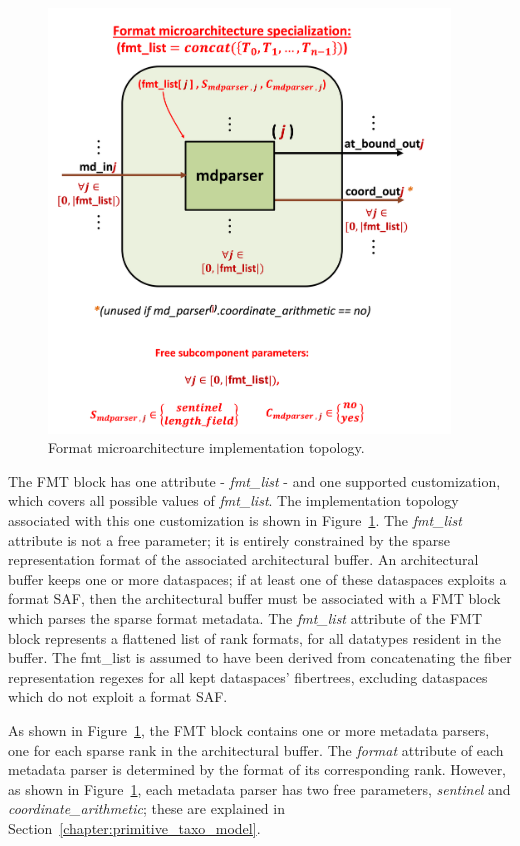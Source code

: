 \begin{figure}[H]
    \centering
    \includegraphics[width=0.95\textwidth]{figures/FMT_all.png}
    \caption{Format microarchitecture implementation topology.}
    \label{fig:FMT_all}
\end{figure}

The FMT block has one attribute - \textit{fmt\_list} - and one supported customization, which covers all possible values of \textit{fmt\_list}. The implementation topology associated with this one customization is shown in Figure~\ref{fig:FMT_all}. The \textit{fmt\_list} attribute is not a free parameter; it is entirely constrained by the sparse representation format of the associated architectural buffer. An architectural buffer keeps\cite{timeloop} one or more dataspaces\cite{timeloop}; if at least one of these dataspaces exploits a format SAF, then the architectural buffer must be associated with a FMT block which parses the sparse format metadata. The \textit{fmt\_list} attribute of the FMT block represents a flattened list of rank formats, for all datatypes resident in the buffer. The  fmt\_list is assumed to have been derived from concatenating the fiber representation regexes\cite{szebook} for all kept dataspaces' fibertrees, excluding dataspaces which do not exploit a format SAF.

As shown in Figure~\ref{fig:FMT_all}, the FMT block contains one or more metadata parsers, one for each sparse rank in the architectural buffer. The \textit{format} attribute of each metadata parser is determined by the format of its corresponding rank. However, as shown in Figure~\ref{fig:FMT_all}, each metadata parser has two free parameters, \textit{sentinel} and \textit{coordinate\_arithmetic}; these are explained in Section~\ref{chapter:primitive_taxo_model}.

